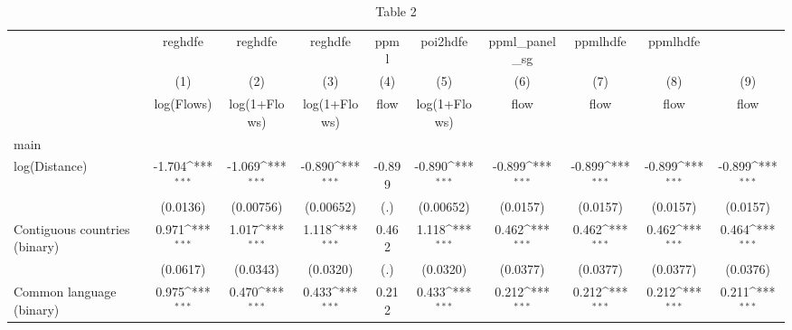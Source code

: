 \begin{table}[htbp]\centering
\def\sym#1{\ifmmode^{#1}\else\(^{#1}\)\fi}
\caption{Table 2}
\begin{tabular}{l*{9}{c}}
\hline\hline
                    &\multicolumn{1}{c}{reghdfe}         &\multicolumn{1}{c}{reghdfe}         &\multicolumn{1}{c}{reghdfe}         &\multicolumn{1}{c}{ppml}         &\multicolumn{1}{c}{poi2hdfe}         &\multicolumn{1}{c}{ppml\_panel\_sg}         &\multicolumn{1}{c}{ppmlhdfe}         &\multicolumn{1}{c}{ppmlhdfe}         &                     \\
                    &\multicolumn{1}{c}{(1)}&\multicolumn{1}{c}{(2)}&\multicolumn{1}{c}{(3)}&\multicolumn{1}{c}{(4)}&\multicolumn{1}{c}{(5)}&\multicolumn{1}{c}{(6)}&\multicolumn{1}{c}{(7)}&\multicolumn{1}{c}{(8)}&\multicolumn{1}{c}{(9)}\\
                    &\multicolumn{1}{c}{log(Flows)}&\multicolumn{1}{c}{log(1+Flows)}&\multicolumn{1}{c}{log(1+Flows)}&\multicolumn{1}{c}{flow}&\multicolumn{1}{c}{log(1+Flows)}&\multicolumn{1}{c}{flow}&\multicolumn{1}{c}{flow}&\multicolumn{1}{c}{flow}&\multicolumn{1}{c}{flow}\\
\hline
main                &                     &                     &                     &                     &                     &                     &                     &                     &                     \\
log(Distance)       &      -1.704\sym{***}&      -1.069\sym{***}&      -0.890\sym{***}&      -0.899         &      -0.890\sym{***}&      -0.899\sym{***}&      -0.899\sym{***}&      -0.899\sym{***}&      -0.899\sym{***}\\
                    &    (0.0136)         &   (0.00756)         &   (0.00652)         &         (.)         &   (0.00652)         &    (0.0157)         &    (0.0157)         &    (0.0157)         &    (0.0157)         \\
[1em]
Contiguous countries (binary)&       0.971\sym{***}&       1.017\sym{***}&       1.118\sym{***}&       0.462         &       1.118\sym{***}&       0.462\sym{***}&       0.462\sym{***}&       0.462\sym{***}&       0.464\sym{***}\\
                    &    (0.0617)         &    (0.0343)         &    (0.0320)         &         (.)         &    (0.0320)         &    (0.0377)         &    (0.0377)         &    (0.0377)         &    (0.0376)         \\
[1em]
Common language (binary)&       0.975\sym{***}&       0.470\sym{***}&       0.433\sym{***}&       0.212         &       0.433\sym{***}&       0.212\sym{***}&       0.212\sym{***}&       0.212\sym{***}&       0.211\sym{***}\\

\end{tabular}
\end{table}
